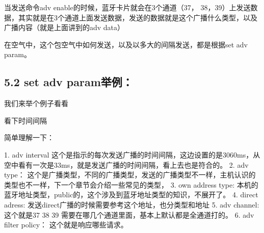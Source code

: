 \documentclass[letterpaper,10pt,english]{sphinxmanual}
\begin{document}
当发送命令adv enable的时候，蓝牙卡片就会在3个通道（37， 38，39）上发送数据，其实就是在3个通道上面发送数据，发送的数据就是这个广播什么类型，以及广播内容（就是上面讲到的adv data）

在空气中，这个包空气中如何发送，以及以多大的间隔发送，都是根据set adv param。


\subsection{5.2 set adv param举例：}
\label{\detokenize{test/ble_adv_scan_all:id5}}
我们来举个例子看看


\begin{sphinxVerbatim}[commandchars=\\\{\}]
    
    
     
   
   
  
      
         
\end{sphinxVerbatim}

看下时间间隔


简单理解一下：

\begin{sphinxVerbatim}[commandchars=\\\{\}]
1. adv interval 这个是指示的每次发送广播的时间间隔，这边设置的是30\PYGZti{}60ms，从空中看有一次是33ms，就是发送广播的时间间隔，看上去也是符合的。
2. adv type： 这个是广播类型，不同的广播类型，发送的广播类型不一样，主机认识的类型也不一样，下一个章节会介绍一些常见的类型，
3. own address type: 本机的蓝牙地址类型，public的，这个涉及到蓝牙地址类型的知识，不展开了。
4. direct adress: 发送direct广播的时候需要参考这个地址，也分类型和地址
5. adv channel: 这个就是37 38 39 需要在哪几个通道里面，基本上默认都是全通道打的。
6. adv filter policy： 这个就是响应哪些请求。
\end{sphinxVerbatim}
\end{document}
